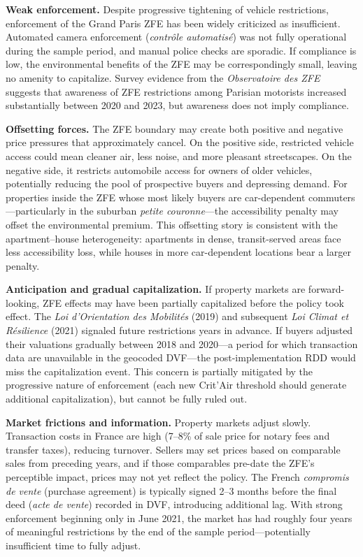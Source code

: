 \documentclass[12pt]{article}
\begin{document}
\textbf{Weak enforcement.} Despite progressive tightening of vehicle restrictions, enforcement of the Grand Paris ZFE has been widely criticized as insufficient. Automated camera enforcement (\textit{contr\^ole automatis\'e}) was not fully operational during the sample period, and manual police checks are sporadic. If compliance is low, the environmental benefits of the ZFE may be correspondingly small, leaving no amenity to capitalize. Survey evidence from the \textit{Observatoire des ZFE} suggests that awareness of ZFE restrictions among Parisian motorists increased substantially between 2020 and 2023, but awareness does not imply compliance.

\textbf{Offsetting forces.} The ZFE boundary may create both positive and negative price pressures that approximately cancel. On the positive side, restricted vehicle access could mean cleaner air, less noise, and more pleasant streetscapes. On the negative side, it restricts automobile access for owners of older vehicles, potentially reducing the pool of prospective buyers and depressing demand. For properties inside the ZFE whose most likely buyers are car-dependent commuters---particularly in the suburban \textit{petite couronne}---the accessibility penalty may offset the environmental premium. This offsetting story is consistent with the apartment--house heterogeneity: apartments in dense, transit-served areas face less accessibility loss, while houses in more car-dependent locations bear a larger penalty.

\textbf{Anticipation and gradual capitalization.} If property markets are forward-looking, ZFE effects may have been partially capitalized before the policy took effect. The \textit{Loi d'Orientation des Mobilit\'es} (2019) and subsequent \textit{Loi Climat et R\'esilience} (2021) signaled future restrictions years in advance. If buyers adjusted their valuations gradually between 2018 and 2020---a period for which transaction data are unavailable in the geocoded DVF---the post-implementation RDD would miss the capitalization event. This concern is partially mitigated by the progressive nature of enforcement (each new Crit'Air threshold should generate additional capitalization), but cannot be fully ruled out.

\textbf{Market frictions and information.} Property markets adjust slowly. Transaction costs in France are high (7--8\% of sale price for notary fees and transfer taxes), reducing turnover. Sellers may set prices based on comparable sales from preceding years, and if those comparables pre-date the ZFE's perceptible impact, prices may not yet reflect the policy. The French \textit{compromis de vente} (purchase agreement) is typically signed 2--3 months before the final deed (\textit{acte de vente}) recorded in DVF, introducing additional lag. With strong enforcement beginning only in June 2021, the market has had roughly four years of meaningful restrictions by the end of the sample period---potentially insufficient time to fully adjust.
\end{document}
